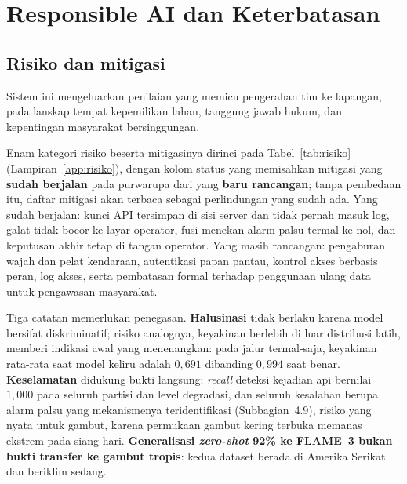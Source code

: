 
\section{Responsible AI dan Keterbatasan}
\label{sec:keterbatasan}

\subsection{Risiko dan mitigasi}

Sistem ini mengeluarkan penilaian yang memicu pengerahan tim ke lapangan, pada
lanskap tempat kepemilikan lahan, tanggung jawab hukum, dan kepentingan
masyarakat bersinggungan.

Enam kategori risiko beserta mitigasinya dirinci pada Tabel~\ref{tab:risiko}
(Lampiran~\ref{app:risiko}), dengan kolom status yang memisahkan mitigasi yang
\textbf{sudah berjalan} pada purwarupa dari yang \textbf{baru rancangan}; tanpa
pembedaan itu, daftar mitigasi akan terbaca sebagai perlindungan yang sudah ada.
Yang sudah berjalan: kunci API tersimpan di sisi server dan tidak pernah masuk
log, galat tidak bocor ke layar operator, fusi menekan alarm palsu termal ke nol,
dan keputusan akhir tetap di tangan operator. Yang masih rancangan: pengaburan
wajah dan pelat kendaraan, autentikasi papan pantau, kontrol akses berbasis
peran, log akses, serta pembatasan formal terhadap penggunaan ulang data untuk
pengawasan masyarakat.

Tiga catatan memerlukan penegasan. \textbf{Halusinasi} tidak berlaku karena model
bersifat diskriminatif; risiko analognya, keyakinan berlebih di luar distribusi
latih, memberi indikasi awal yang menenangkan: pada jalur termal-saja, keyakinan
rata-rata saat model keliru adalah $0{,}691$ dibanding $0{,}994$ saat benar.
\textbf{Keselamatan} didukung bukti langsung: \emph{recall} deteksi kejadian api
bernilai $1{,}000$ pada seluruh partisi dan level degradasi, dan seluruh
kesalahan berupa alarm palsu yang mekanismenya teridentifikasi
(Subbagian~4.9), risiko yang nyata untuk gambut, karena permukaan gambut kering
terbuka memanas ekstrem pada siang hari. \textbf{Generalisasi \emph{zero-shot}
92\% ke FLAME~3 bukan bukti transfer ke gambut tropis}: kedua dataset berada di
Amerika Serikat dan beriklim sedang.

